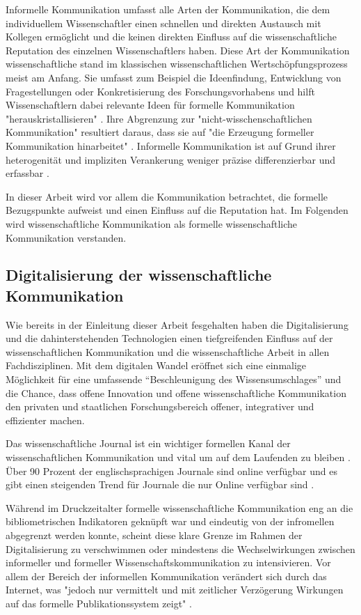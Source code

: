 Informelle Kommunikation umfasst alle Arten der Kommunikation, die dem individuellem Wissenschaftler einen schnellen und direkten Austausch mit Kollegen ermöglicht und die keinen direkten Einfluss auf die wissenschaftliche Reputation des einzelnen Wissenschaftlers haben. Diese Art der Kommunikation wissenschaftliche stand im klassischen wissenschaftlichen Wertschöpfungsprozess meist am Anfang. Sie umfasst zum Beispiel die Ideenfindung, Entwicklung von Fragestellungen oder Konkretisierung des Forschungsvorhabens und hilft Wissenschaftlern dabei relevante Ideen für formelle Kommunikation "herauskristallisieren" \cite{Hanekop_2014}. Ihre Abgrenzung zur "nicht-wisschenschaftlichen Kommunikation" resultiert daraus, dass sie auf "die Erzeugung formeller Kommunikation hinarbeitet" \cite{kaden_2009_library}. Informelle Kommunikation ist auf Grund ihrer heterogenität und impliziten Verankerung weniger präzise differenzierbar und erfassbar \cite{kaden_2009_library}.

In dieser Arbeit wird vor allem die Kommunikation betrachtet, die formelle Bezugspunkte aufweist und einen Einfluss auf die Reputation hat. Im Folgenden wird wissenschaftliche Kommunikation als formelle wissenschaftliche Kommunikation verstanden.

\subsection{Digitalisierung der wissenschaftliche Kommunikation}

Wie bereits in der Einleitung dieser Arbeit fesgehalten haben die Digitalisierung und die dahinterstehenden Technologien einen tiefgreifenden Einfluss auf der wissenschaftlichen Kommunikation und die wissenschaftliche Arbeit in allen Fachdisziplinen. Mit dem digitalen Wandel eröffnet sich eine einmalige Möglichkeit für eine umfassende “Beschleunigung des Wissensumschlages” \cite{Wenzel_2003} und die Chance, dass offene Innovation und offene wissenschaftliche Kommunikation den privaten und staatlichen Forschungsbereich offener, integrativer und effizienter machen.

Das wissenschaftliche Journal ist ein wichtiger formellen Kanal der wissenschaftlichen Kommunikation und vital um auf dem Laufenden zu bleiben \cite{cope2014future}. Über 90 Prozent der englischsprachigen Journale sind online verfügbar und es gibt einen steigenden Trend für Journale die nur Online verfügbar sind \cite{cope2014future}.

Während im Druckzeitalter formelle wissenschaftliche Kommunikation eng an die bibliometrischen Indikatoren geknüpft war und eindeutig von der infromellen abgegrenzt werden konnte, scheint diese klare Grenze im Rahmen der Digitalisierung zu verschwimmen oder mindestens die Wechselwirkungen zwischen informeller und formeller Wissenschaftskommunikation zu intensivieren. Vor allem der Bereich der informellen Kommunikation verändert sich durch das Internet, was "jedoch nur vermittelt und mit zeitlicher Verzögerung Wirkungen auf das formelle Publikationssystem zeigt" \cite{Hanekop_2014}.

